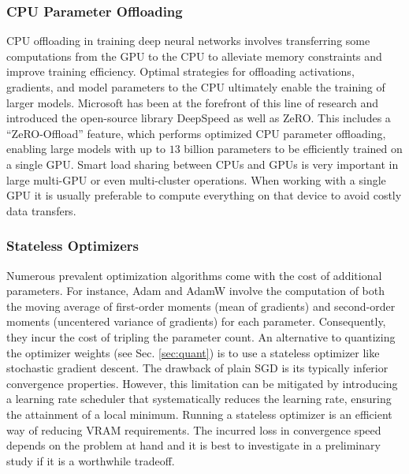 \documentclass[conference]{IEEEtran}
\begin{document}
\subsubsection{CPU Parameter Offloading}\label{sec:param_offloading}
CPU offloading in training deep neural networks involves transferring some computations from the GPU to the CPU to alleviate memory constraints and improve training efficiency. Optimal strategies for offloading activations, gradients, and model parameters to the CPU ultimately enable the training of larger models. Microsoft has been at the forefront of this line of research and introduced the open-source library DeepSpeed \cite{deepspeed} as well as ZeRO\cite{zero_offload}. This includes a ``ZeRO-Offload'' feature, which performs optimized CPU parameter offloading, enabling large models with up to $13$ billion parameters to be efficiently trained on a single GPU.
Smart load sharing between CPUs and GPUs is very important in large multi-GPU or even multi-cluster operations. When working with a single GPU it is usually preferable to compute everything on that device to avoid costly data transfers.

\subsubsection{Stateless Optimizers}
Numerous prevalent optimization algorithms come with the cost of additional parameters. For instance, Adam \cite{kingma_adam_2017} and AdamW \cite{loshchilov_decoupled_2019} involve the computation of both the moving average of first-order moments (mean of gradients) and second-order moments (uncentered variance of gradients) for each parameter. Consequently, they incur the cost of tripling the parameter count. An alternative to quantizing the optimizer weights (see Sec. \ref{sec:quant}) is to use a stateless optimizer like stochastic gradient descent. The drawback of plain SGD is its typically inferior convergence properties. However, this limitation can be mitigated by introducing a learning rate scheduler \cite{loshchilov_sgdr_2017} that systematically reduces the learning rate, ensuring the attainment of a local minimum.
Running a stateless optimizer is an efficient way of reducing VRAM requirements. The incurred loss in convergence speed depends on the problem at hand and it is best to investigate in a preliminary study if it is a worthwhile tradeoff. 

\end{document}

